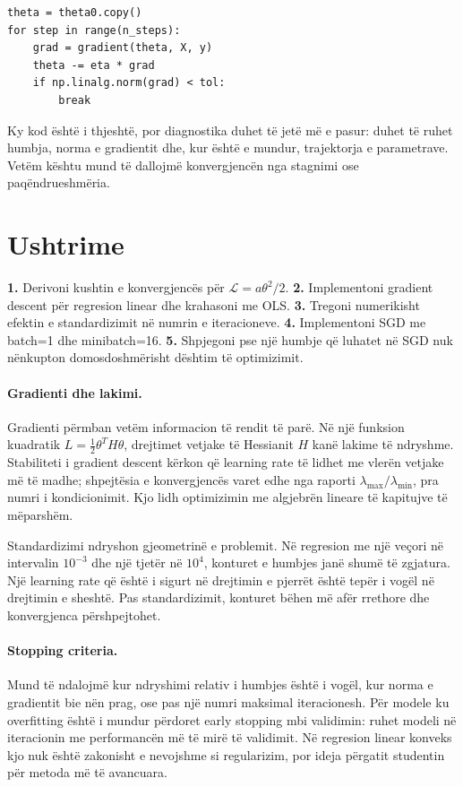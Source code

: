 \documentclass[12pt,a4paper,oneside]{book}
\begin{document}
\begin{lstlisting}
theta = theta0.copy()
for step in range(n_steps):
    grad = gradient(theta, X, y)
    theta -= eta * grad
    if np.linalg.norm(grad) < tol:
        break
\end{lstlisting}
Ky kod është i thjeshtë, por diagnostika duhet të jetë më e pasur: duhet të ruhet humbja, norma e gradientit dhe, kur është e mundur, trajektorja e parametrave. Vetëm kështu mund të dallojmë konvergjencën nga stagnimi ose paqëndrueshmëria.

\section{Ushtrime}

\textbf{1.} Derivoni kushtin e konvergjencës për $\mathcal L=a\theta^2/2$. \textbf{2.} Implementoni gradient descent për regresion linear dhe krahasoni me OLS. \textbf{3.} Tregoni numerikisht efektin e standardizimit në numrin e iteracioneve. \textbf{4.} Implementoni SGD me batch=1 dhe minibatch=16. \textbf{5.} Shpjegoni pse një humbje që luhatet në SGD nuk nënkupton domosdoshmërisht dështim të optimizimit.


\paragraph{Gradienti dhe lakimi.}
Gradienti përmban vetëm informacion të rendit të parë. Në një funksion kuadratik $L=\tfrac12\theta^TH\theta$, drejtimet vetjake të Hessianit $H$ kanë lakime të ndryshme. Stabiliteti i gradient descent kërkon që learning rate të lidhet me vlerën vetjake më të madhe; shpejtësia e konvergjencës varet edhe nga raporti $\lambda_{\max}/\lambda_{\min}$, pra numri i kondicionimit. Kjo lidh optimizimin me algjebrën lineare të kapitujve të mëparshëm.

Standardizimi ndryshon gjeometrinë e problemit. Në regresion me një veçori në intervalin $10^{-3}$ dhe një tjetër në $10^4$, konturet e humbjes janë shumë të zgjatura. Një learning rate që është i sigurt në drejtimin e pjerrët është tepër i vogël në drejtimin e sheshtë. Pas standardizimit, konturet bëhen më afër rrethore dhe konvergjenca përshpejtohet.

\paragraph{Stopping criteria.}
Mund të ndalojmë kur ndryshimi relativ i humbjes është i vogël, kur norma e gradientit bie nën prag, ose pas një numri maksimal iteracionesh. Për modele ku overfitting është i mundur përdoret early stopping mbi validimin: ruhet modeli në iteracionin me performancën më të mirë të validimit. Në regresion linear konveks kjo nuk është zakonisht e nevojshme si regularizim, por ideja përgatit studentin për metoda më të avancuara.
\end{document}
